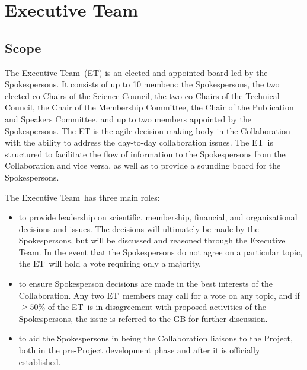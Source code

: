 \documentclass[12pt]{article}
\newcommand{\exec}{{Executive Team}}
\newcommand{\shorte}{{ET}}  %
\begin{document}
\section{\exec}
\label{sec:exec}

\subsection{Scope}

The \exec \ (\shorte) is an elected and appointed board led by the Spokespersons. It consists of up to 10 members: the Spokespersons, the two elected co-Chairs of the Science Council, the two co-Chairs of the Technical Council, the Chair of the Membership Committee, the Chair of the Publication and Speakers Committee, and up to two members appointed by the Spokespersons. The ET is the agile decision-making body in the Collaboration with the ability to address the day-to-day collaboration issues.  The \shorte\ is structured to facilitate the flow of information to the Spokespersons from the Collaboration and vice versa, as well as to provide a sounding board for the Spokespersons.

The \exec \ has three main roles:
\begin{itemize}

\item to provide leadership on scientific, membership, financial, and organizational decisions and issues. The decisions will ultimately be made by the Spokespersons, but will be discussed and reasoned through the \exec.  In the event that the Spokespersons do not agree on a particular topic, the \shorte\ will hold a vote requiring only a majority.

\item to ensure Spokesperson decisions are made in the best interests of the Collaboration.  Any two \shorte\ members may call for a vote on any topic, and if $\geq 50\%$ of the \shorte\ is in disagreement with proposed activities of the Spokespersons, the issue is referred to the GB for further discussion. 

\item to aid the Spokespersons in being the Collaboration liaisons to the Project, both in the pre-Project development phase and after it is officially established.

\end{itemize}
\end{document}
